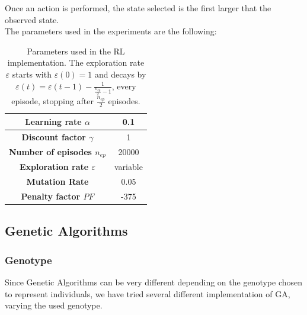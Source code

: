 Once an action is performed, the state selected is the first larger that the observed state.\\
The parameters used in the experiments are the following:


\begin{table}[htb]%
	\centering
	\label{tab:RL_parameters}
	\begin{tabular}{|S|S|} 		%
		
		\hline
		{\textbf{Learning rate $\alpha$}} &  {0.1} \\
		\hline
		{\textbf{Discount factor $\gamma$}} & {1} \\
		\hline
		{\textbf{Number of episodes $n_{ep}$}} & {20000} \\
		\hline
		{\textbf{Exploration rate $\varepsilon$}}  & {variable} \\
		\hline
		{\textbf{Mutation Rate}} & {0.05} \\
		\hline
		{\textbf{Penalty factor $PF$}}& {-375} \\
		\hline
		
	\end{tabular}
	\caption{Parameters used in the RL implementation. The exploration rate $\varepsilon$ starts with $\varepsilon(0)=1$ and decays by $\varepsilon(t) = \varepsilon(t - 1) - \frac{1}{\frac{n_{ep}}{2} - 1}$, every episode, stopping after $\frac{n_{ep}}{2}$ episodes. }
\end{table}



\subsection{Genetic Algorithms}

\subsubsection{Genotype}
Since Genetic Algorithms can be very different depending on the genotype chosen to represent individuals, we have tried several different implementation of GA, varying the used genotype.
\\


